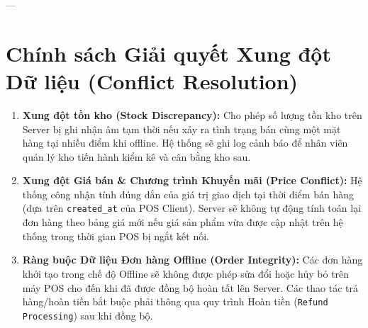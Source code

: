 \documentclass[12pt,a4paper]{article}
\begin{document}
	---
	
	\section{Chính sách Giải quyết Xung đột Dữ liệu (Conflict Resolution)}
	
	\begin{enumerate}
		\item \textbf{Xung đột tồn kho (Stock Discrepancy):}
		Cho phép số lượng tồn kho trên Server bị ghi nhận âm tạm thời nếu xảy ra tình trạng bán cùng một mặt hàng tại nhiều điểm khi offline. Hệ thống sẽ ghi log cảnh báo để nhân viên quản lý kho tiến hành kiểm kê và cân bằng kho sau.
		
		\item \textbf{Xung đột Giá bán \& Chương trình Khuyến mãi (Price Conflict):}
		Hệ thống công nhận tính đúng đắn của giá trị giao dịch tại thời điểm bán hàng (dựa trên \texttt{created\_at} của POS Client). Server sẽ không tự động tính toán lại đơn hàng theo bảng giá mới nếu giá sản phẩm vừa được cập nhật trên hệ thống trong thời gian POS bị ngắt kết nối.
		
		\item \textbf{Ràng buộc Dữ liệu Đơn hàng Offline (Order Integrity):}
		Các đơn hàng khởi tạo trong chế độ Offline sẽ không được phép sửa đổi hoặc hủy bỏ trên máy POS cho đến khi đã được đồng bộ hoàn tất lên Server. Các thao tác trả hàng/hoàn tiền bắt buộc phải thông qua quy trình Hoàn tiền (\texttt{Refund Processing}) sau khi đồng bộ.
	\end{enumerate}
	
\end{document}
